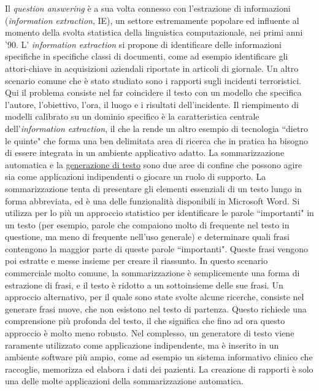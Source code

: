 \documentclass[]{../../metanetpaper}
\begin{document}
\begin{multicols}{2}
Il \emph{question answering} \`{e} a sua volta connesso con l'estrazione di informazioni (\emph{information extraction}, IE), un settore estremamente popolare ed influente al momento della svolta statistica della linguistica computazionale, nei primi anni '90. L' \emph{information extraction} si propone di identificare delle informazioni specifiche in specifiche classi di documenti, come ad esempio identificare gli attori-chiave in acquisizioni aziendali riportate in articoli di giornale. Un altro scenario comune che \`{e} stato studiato sono i rapporti sugli incidenti terroristici. Qui il problema consiste nel far coincidere il testo con un modello che specifica l'autore, l'obiettivo, l'ora, il luogo e i risultati dell'incidente. Il riempimento di modelli calibrato su un dominio specifico \`{e} la caratteristica centrale dell'\emph{information extraction}, il che la rende un altro esempio di tecnologia “dietro le quinte" che forma una ben delimitata area di ricerca che in pratica ha bisogno di essere integrata in un ambiente applicativo adatto.
La sommarizzazione automatica e la \underline{generazione di testo} sono due aree di confine che possono agire sia come applicazioni indipendenti o giocare un ruolo di supporto. La sommarizzazione tenta di presentare gli elementi essenziali di un testo lungo in forma abbreviata, ed \`{e} una delle funzionalit\`{a} disponibili in Microsoft Word. Si utilizza per lo pi\`{u} un approccio statistico per identificare le parole “importanti" in un testo (per esempio, parole che compaiono molto di frequente nel testo in questione, ma meno di frequente nell'uso generale) e determinare quali frasi contengono la maggior parte di queste parole “importanti". Queste frasi vengono poi estratte e messe insieme per creare il riassunto. In questo scenario commerciale molto comune, la sommarizzazione \`{e} semplicemente una forma di estrazione di frasi, e il testo \`{e} ridotto a un sottoinsieme delle sue frasi. Un approccio alternativo, per il quale sono state svolte alcune ricerche, consiste nel generare frasi nuove, che non esistono nel testo di partenza. Questo richiede una comprensione pi\`{u} profonda del testo, il che significa che fino ad ora questo approccio \`{e} molto meno robusto. Nel complesso, un generatore di testo viene raramente utilizzato come applicazione indipendente, ma \`{e} inserito in un ambiente software pi\`{u} ampio, come ad esempio un sistema informativo clinico che raccoglie, memorizza ed elabora i dati dei pazienti. La creazione di rapporti \`{e} solo una delle molte applicazioni della sommarizzazione automatica.




\end{multicols}
\end{document}
